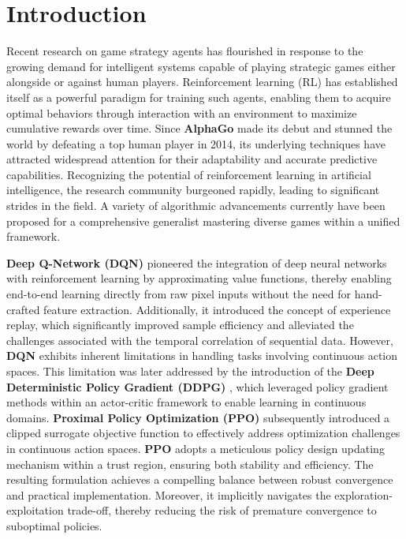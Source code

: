 \section{Introduction}
Recent research on game strategy agents has flourished in response to the growing demand for intelligent systems capable of playing 
strategic games either alongside or against human players. 
Reinforcement learning (RL) has established itself as a powerful paradigm for training such agents, enabling them to acquire optimal 
behaviors through interaction with an environment to maximize cumulative rewards over time. 
Since \textbf{AlphaGo} \cite{Silver2016} made its debut and stunned the world by defeating a top human player in 2014, 
its underlying techniques have attracted widespread attention for their adaptability and accurate predictive capabilities. 
Recognizing the potential of reinforcement learning in artificial intelligence, the research community burgeoned rapidly, 
leading to significant strides in the field. 
A variety of algorithmic advancements currently have been proposed for a comprehensive generalist mastering diverse games within a unified framework. 

\textbf{Deep Q-Network (DQN)} \cite{mnih2013playingatarideepreinforcement} pioneered the integration of deep neural networks with reinforcement 
learning by approximating value functions, thereby enabling end-to-end learning directly from raw pixel inputs without the need for hand-crafted 
feature extraction. 
Additionally, it introduced the concept of experience replay, which significantly improved sample efficiency and alleviated the challenges 
associated with the temporal correlation of sequential data. 
However, \textbf{DQN} exhibits inherent limitations in handling tasks involving continuous action spaces. 
This limitation was later addressed by the 
introduction of the \textbf{Deep Deterministic Policy Gradient (DDPG)} \cite{lillicrap2019continuouscontroldeepreinforcement}, 
which leveraged policy gradient methods within an actor-critic framework to enable learning in continuous domains.
\textbf{Proximal Policy Optimization (PPO)} \cite{schulman2017proximalpolicyoptimizationalgorithms} subsequently introduced a 
clipped surrogate objective function to effectively address optimization challenges in continuous action spaces. 
\textbf{PPO} adopts a meticulous policy design updating mechanism within a trust region, ensuring both stability and efficiency. 
The resulting formulation achieves a compelling balance between robust convergence and practical implementation. 
Moreover, it implicitly navigates the exploration-exploitation trade-off, thereby reducing the risk of premature convergence to suboptimal policies.

